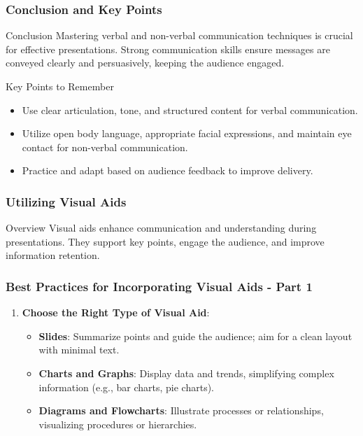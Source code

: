 \documentclass[aspectratio=169]{beamer}
\begin{document}
\begin{frame}[fragile]
    \frametitle{Conclusion and Key Points}
    \begin{block}{Conclusion}
        Mastering verbal and non-verbal communication techniques is crucial for effective presentations. Strong communication skills ensure messages are conveyed clearly and persuasively, keeping the audience engaged.
    \end{block}
    \begin{block}{Key Points to Remember}
        \begin{itemize}
            \item Use clear articulation, tone, and structured content for verbal communication.
            \item Utilize open body language, appropriate facial expressions, and maintain eye contact for non-verbal communication.
            \item Practice and adapt based on audience feedback to improve delivery.
        \end{itemize}
    \end{block}
\end{frame}

\begin{frame}[fragile]
    \frametitle{Utilizing Visual Aids}
    \begin{block}{Overview}
        Visual aids enhance communication and understanding during presentations. They support key points, engage the audience, and improve information retention.
    \end{block}
\end{frame}

\begin{frame}[fragile]
    \frametitle{Best Practices for Incorporating Visual Aids - Part 1}
    \begin{enumerate}
        \item \textbf{Choose the Right Type of Visual Aid}:
            \begin{itemize}
                \item \textbf{Slides}: Summarize points and guide the audience; aim for a clean layout with minimal text.
                \item \textbf{Charts and Graphs}: Display data and trends, simplifying complex information (e.g., bar charts, pie charts).
                \item \textbf{Diagrams and Flowcharts}: Illustrate processes or relationships, visualizing procedures or hierarchies.
            \end{itemize}
    \end{enumerate}
\end{frame}
\end{document}

